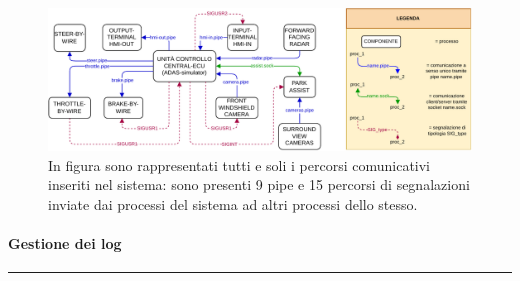 \documentclass[11pt, openany]{article}
\theoremstyle{definition}
\theoremstyle{plain}
\theoremstyle{remark}
\begin{document}
			\begin{figure}[t]
				\includegraphics[scale=0.9, center]{./include/SO_Progetto_Diagrammi-Comunicazione.pdf}
				\caption{In figura sono rappresentati tutti e soli i percorsi comunicativi inseriti nel sistema: sono presenti 9 pipe e 15 percorsi di segnalazioni inviate dai processi del sistema ad altri processi dello stesso.}
				\label{fig:comunicazione}
			\end{figure}
		\paragraph{Gestione dei log}
			\lipsum







			\newpage


	\newpage
	\hrule
	\tableofcontents
\end{document}
